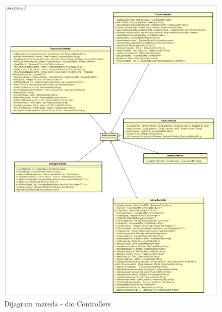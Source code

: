 			\begin{figure}[H] %
				\centering
				\includegraphics[width=\textwidth]{slike/controllerdiagram.png}
				\caption{Dijagram razreda - dio Controllers}
				\label{fig:Controllerdiagram}
			\end{figure}	
		
		\eject
		
